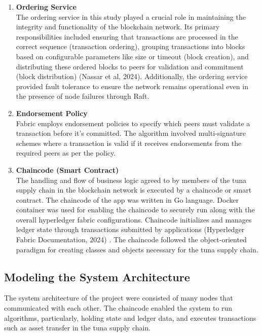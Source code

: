 \begin{enumerate}
		\item \textbf{Ordering Service} \\ The ordering service in this study played a crucial role in maintaining the integrity and functionality of the blockchain network. Its primary responsibilities included ensuring that transactions are processed in the correct sequence (transaction ordering), grouping transactions into blocks based on configurable parameters like size or timeout (block creation), and distributing these ordered blocks to peers for validation and commitment (block distribution) (Nassar et al, 2024)\nocite{method-3}. Additionally, the ordering service provided fault tolerance to ensure the network remains operational even in the presence of node failures through Raft.
		
		\item \textbf{Endorsement Policy} \\Fabric employs endorsement policies to specify which peers must validate a transaction before it's committed. The algorithm involved multi-signature schemes where a transaction is valid if it receives endorsements from the required peers as per the policy.
		
		\item \textbf{Chaincode (Smart Contract)} \\The handling and flow of business logic agreed to by members of the tuna supply chain in the blockchain network is executed by a chaincode or smart contract. The chaincode of the app was written in Go language. Docker container was used for enabling the chaincode to securely run along with the overall hyperledger fabric configurations. Chaincode initializes and manages ledger state through transactions submitted by applications (Hyperledger Fabric Documentation, 2024) \nocite{method-4}. The chaincode followed the object-oriented paradigm for creating classes and objects necessary for the tuna supply chain.
		
		
	\end{enumerate}

\subsection{Modeling the System Architecture}
The system architecture of the project were consisted of many nodes that communicated with each other. The chaincode enabled the system to run algorithms, particularly, holding state and ledger data, and executes transactions such as asset transfer in the tuna supply chain. 

